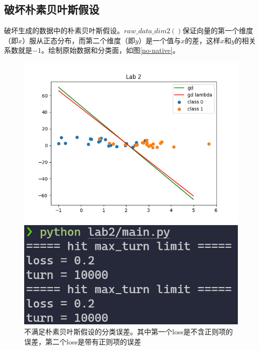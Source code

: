 \subsection{破坏朴素贝叶斯假设}

破坏生成的数据中的朴素贝叶斯假设。$raw\_data\_dim2()$保证向量的第一个维度（即$x$）服从正态分布，而第二个维度（即$y$）是一个值与$x$的差，这样$x$和$y$的相关系数就是$-1$。绘制原始数据和分类面，如图\ref{no-native}。

\begin{figure}[htbp]
    \begin{minipage}[t]{0.5\linewidth}
        \centering
        \includegraphics[width=\textwidth]{figures/Figure_6.png}
        \caption{不满足朴素贝叶斯假设的原始数据，使用逻辑回归进行分类}
        \label{no-native}
    \end{minipage}
    \begin{minipage}[t]{0.5\linewidth}
        \centering
        \includegraphics[width=\textwidth]{figures/Figure_7.png}
        \caption{不满足朴素贝叶斯假设的分类误差。其中第一个loss是不含正则项的误差，第二个loss是带有正则项的误差}
        \label{no-native-loss}
    \end{minipage}
\end{figure}

